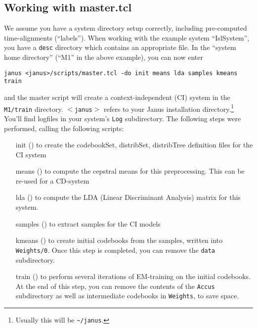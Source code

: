 \subsection{Working with master.tcl} \label{janus:master.tcl}

We  assume  you have  a  system directory   setup correctly, including
pre-computed   time-alignments   (``labels''). When  working with  the
example system ``IslSystem'', you have a \texttt{desc} directory which
contains  an appropriate    file. In the ``system
home directory'' (``M1'' in the above example), you can now enter

\begin{verbatim}
janus <janus>/scripts/master.tcl -do init means lda samples kmeans train
\end{verbatim} 

and the master script will create a context-independent (CI) system in
the \texttt{M1/train}  directory.  \texttt{$<$janus$>$} refers to your
Janus  installation     directory.\footnote{Usually   this   will   be
\texttt{\~{ }/janus}.}   You'll find    logfiles  in   your system's
\texttt{Log}   subdirectory.    The following  steps  were  performed,
calling the following scripts:

\begin{enumerate}
\item[init] ()
  to create the codebookSet, distribSet, distribTree definition files
  for the CI system

\item[means] ()
  to compute the cepstral means for this preprocessing. This can be
  re-used for a CD-system

\item[lda] ()
  to compute the LDA (Linear Discriminant Analysis) matrix for this
  system.

\item[samples] ()
  to extract samples for the CI models

\item[kmeans] ()
  to create initial codebooks from the samples, written into {\tt Weights/0}.
  Once this step is completed, you can remove the {\tt data} subdirectory.

\item[train] ()
  to perform several iterations of EM-training on the initial codebooks.
  At the end of this step, you can remove the contents of the {\tt Accus}
  subdirectory as well as intermediate codebooks in {\tt Weights}, to save
  space.

\end{enumerate}


